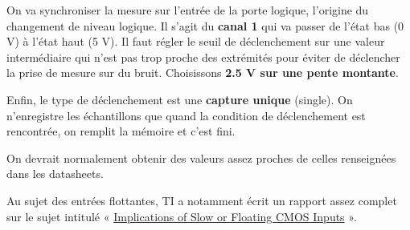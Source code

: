 \documentclass{../template/labo}
\begin{document}









{
	On va synchroniser la mesure sur l'entrée de la porte logique, l'origine du changement de niveau logique.
	Il s'agit du \textbf{canal 1} qui va passer de l'état bas (0 V) à l'état haut (5 V).
	Il faut régler le seuil de déclenchement sur une valeur intermédiaire qui n'est pas trop proche des extrémités pour éviter de déclencher la prise de mesure sur du bruit.
	Choisissons \textbf{2.5 V sur une pente montante}.

	Enfin, le type de déclenchement est une \textbf{capture unique} (single). On n'enregistre les échantillons que quand la condition de déclenchement est rencontrée, on remplit la mémoire et c'est fini.
}

{
	On devrait normalement obtenir des valeurs assez proches de celles renseignées dans les datasheets.

	Au sujet des entrées flottantes, TI a notamment écrit un rapport assez complet sur le sujet intitulé « \href{https://e2e.ti.com/cfs-file/__key/communityserver-discussions-components-files/151/4760.scba004c_5F00_slownfloatingCMOS.pdf}{Implications of Slow or Floating CMOS Inputs} ».
}
\end{document}
